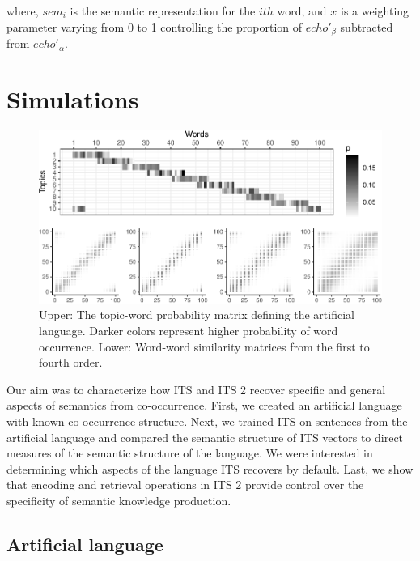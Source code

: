 \documentclass[10pt,letterpaper]{article}
\begin{document}
\noindent where, \(sem_i\) is the semantic representation for the \(ith\) word, and \(x\) is a weighting parameter varying from 0 to 1 controlling the proportion of \(echo'_\beta\) subtracted from \(echo'_\alpha\).

\section{Simulations}

\begin{figure}

\includegraphics[width=\textwidth]{ITS_cogsci_files/figure-latex/artlang-1.pdf}

\caption{Upper: The topic-word probability matrix defining the artificial language. Darker colors represent higher probability of word occurrence. Lower: Word-word similarity matrices from the first to fourth order.}\label{fig:artlang}
\end{figure}

Our aim was to characterize how ITS and ITS 2 recover specific and general aspects of semantics from co-occurrence. First, we created an artificial language with known co-occurrence structure. Next, we trained ITS on sentences from the artificial language and compared the semantic structure of ITS vectors to direct measures of the semantic structure of the language. We were interested in determining which aspects of the language ITS recovers by default. Last, we show that encoding and retrieval operations in ITS 2 provide control over the specificity of semantic knowledge production.

\subsection{Artificial language}
\end{document}
